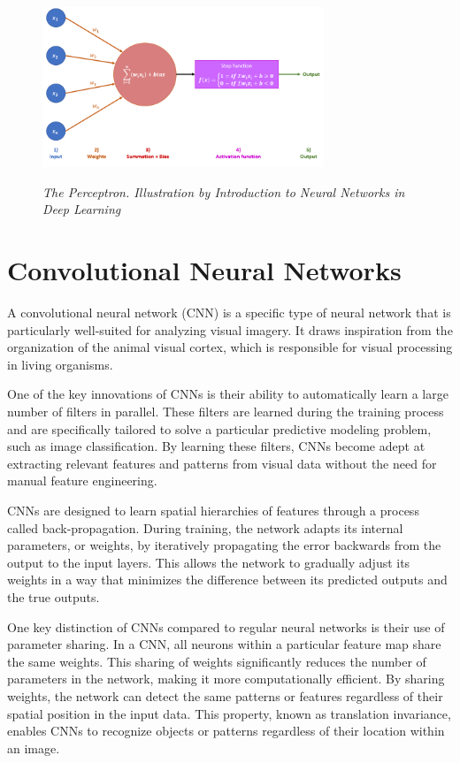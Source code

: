 \begin{figure}[H]
  \centering
  \includegraphics[width=0.75\textwidth]{imatges/preliminaries/perceptron.png}
  \caption[The Perceptron]{\textit{The Perceptron. Illustration by Introduction to Neural Networks in Deep Learning}}
  {\label{fig:perceptron}}
\end{figure}


\section{Convolutional Neural Networks}

A convolutional neural network (CNN) is a specific type of neural network that
is particularly well-suited for analyzing visual imagery. It draws inspiration
from the organization of the animal visual cortex, which is responsible for
visual processing in living organisms. \newline

One of the key innovations of CNNs is their ability to automatically learn a
large number of filters in parallel. These filters are learned during the
training process and are specifically tailored to solve a particular predictive
modeling problem, such as image classification. By learning these filters, CNNs
become adept at extracting relevant features and patterns from visual data
without the need for manual feature engineering. \newline

CNNs are designed to learn spatial hierarchies of features through a process
called back-propagation. During training, the network adapts its internal
parameters, or weights, by iteratively propagating the error backwards from the
output to the input layers. This allows the network to gradually adjust its
weights in a way that minimizes the difference between its predicted outputs
and the true outputs. \newline

One key distinction of CNNs compared to regular neural networks is their use of
parameter sharing. In a CNN, all neurons within a particular feature map share
the same weights. This sharing of weights significantly reduces the number of
parameters in the network, making it more computationally efficient. By sharing
weights, the network can detect the same patterns or features regardless of
their spatial position in the input data. This property, known as translation
invariance, enables CNNs to recognize objects or patterns regardless of their
location within an image.\newline

